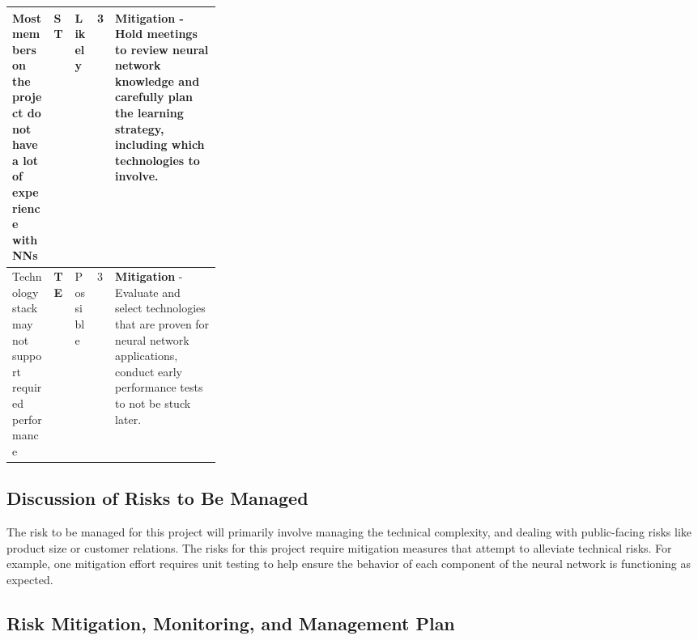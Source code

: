 \documentclass[english,12pt]{article}
\begin{document}
\begin{longtable}{|P{0.20\linewidth}|P{0.10\linewidth}|P{0.10cm}|P{0.5cm}|P{5.5cm}|}
  Most members on the project do not have a lot of experience with NNs & \textbf{ST} & Likely & 3 & 
  \small \textbf{Mitigation} - Hold meetings to review neural network knowledge and carefully plan the learning strategy, including which technologies to involve.\\
  \hline

  Technology stack may not support required performance & \textbf{TE} & Possible & 3 & 
  \small \textbf{Mitigation} - Evaluate and select technologies that are proven for neural network applications, conduct early performance tests to not be stuck later.\\
  \hline

\end{longtable}

\subsection{Discussion of Risks to Be Managed}
The risk to be managed for this project will primarily involve managing the technical complexity,
and dealing with public-facing risks like product size or customer relations. The risks for 
this project require mitigation measures that attempt to alleviate technical risks. For example,
one mitigation effort requires unit testing to help ensure the behavior of each component
of the neural network is functioning as expected.
\pagebreak
\subsection{Risk Mitigation, Monitoring, and Management Plan}
\end{document}
